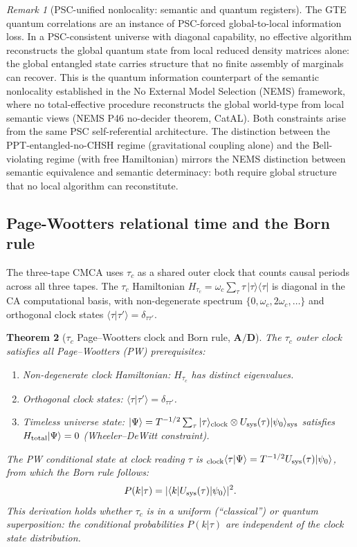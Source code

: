 \documentclass[11pt]{article}
\newtheorem{theorem}{Theorem}[section]
\theoremstyle{remark}
\newtheorem{remark}[theorem]{Remark}
\newcommand{\CatAD}{\textbf{A/D}}
\begin{document}
\begin{remark}[PSC-unified nonlocality: semantic and quantum registers]
\label{rem:psc_unified_nonlocality}
The GTE quantum correlations are an instance of PSC-forced global-to-local information loss.
In a PSC-consistent universe with diagonal capability, no effective algorithm reconstructs
the global quantum state from local reduced density matrices alone: the global entangled state
carries structure that no finite assembly of marginals can recover. This is the quantum
information counterpart of the semantic nonlocality established in the No External Model Selection (NEMS) framework, where
no total-effective procedure reconstructs the global world-type from local semantic views
(NEMS P46 no-decider theorem, CatAL). Both constraints arise from the same PSC
self-referential architecture. The distinction between the PPT-entangled-no-CHSH regime
(gravitational coupling alone) and the Bell-violating regime (with free Hamiltonian)
mirrors the NEMS distinction between semantic equivalence and semantic determinacy: both
require global structure that no local algorithm can reconstitute.
\end{remark}

\subsection{Page-Wootters relational time and the Born rule}
\label{ssec:pw_born}

The three-tape CMCA uses $\tau_c$ as a shared outer clock that counts causal
periods across all three tapes. The $\tau_c$ Hamiltonian
$H_{\tau_c} = \omega_c\sum_{\tau}\tau\,|\tau\rangle\langle\tau|$
is diagonal in the CA computational basis, with non-degenerate spectrum
$\{0, \omega_c, 2\omega_c, \ldots\}$ and orthogonal clock states
$\langle\tau|\tau'\rangle = \delta_{\tau\tau'}$.

\begin{theorem}[$\tau_c$ Page--Wootters clock and Born rule, $\CatAD$]
\label{thm:pw_born}
The $\tau_c$ outer clock satisfies all Page--Wootters (PW) prerequisites:
\begin{enumerate}[label=(\roman*),itemsep=2pt]
\item Non-degenerate clock Hamiltonian: $H_{\tau_c}$ has distinct eigenvalues.
\item Orthogonal clock states: $\langle\tau|\tau'\rangle = \delta_{\tau\tau'}$.
\item Timeless universe state: $|\Psi\rangle = T^{-1/2}\sum_\tau
      |\tau\rangle_{\rm clock}\otimes U_{\rm sys}(\tau)|\psi_0\rangle_{\rm sys}$
      satisfies $H_{\rm total}|\Psi\rangle = 0$ (Wheeler--DeWitt constraint).
\end{enumerate}
The PW conditional state at clock reading $\tau$ is
${}_{\rm clock}\langle\tau|\Psi\rangle = T^{-1/2} U_{\rm sys}(\tau)|\psi_0\rangle$,
from which the Born rule follows:
\[
  P(k|\tau) = |\langle k|U_{\rm sys}(\tau)|\psi_0\rangle|^2.
\]
This derivation holds whether $\tau_c$ is in a uniform (``classical'') or
quantum superposition: the conditional probabilities $P(k|\tau)$ are independent
of the clock state distribution.
\end{theorem}
\end{document}
